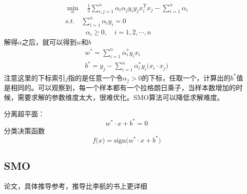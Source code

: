 \documentclass{ctexart}
\begin{document}
\begin{description}
\begin{equation}
\begin{array}{lcl}
\min\limits_{\alpha}\quad  \frac{1}{2}\sum\limits_{i,j=1}^{n}\alpha_i\alpha_{j}y_{i}y_{j}x_{i}^{\mathrm{T}}x_j -\sum\limits_{i=1}^{n}\alpha_{i}\\
s.t. \quad \sum\limits_{i=1}^{n}\alpha_{i}y_i=0\\
\quad\quad\quad \alpha_i\ge0,\quad i=1,2,\cdots,n
\end{array}
\end{equation}
解得$\alpha$之后，就可以得到$w$和$b$
\begin{equation}
\begin{array}{lcl}
w^{*}=\sum\limits_{i=1}^{n}\alpha_{i}^{*}y_{i}x_{i}\\
b^*=y_j-\sum\limits_{i=1}^{n}\alpha_{i}^{*}y_{i}\big(x_{i}\cdot x_{j} \big)
\end{array}
\end{equation}
注意这里的下标索引$j$指的是任意一个令$\alpha_j>0$的下标，任取一个，计算出的$b^*$值是相同的。可以观察到，每一个样本都有一个拉格朗日乘子，当样本数增加的时候，需要求解的参数维度太大，很难优化。SMO算法可以降低求解难度。

分离超平面：
\begin{equation}
w^*\cdot x+b^*=0
\end{equation}
分类决策函数
\begin{equation}
f\big(x\big)=\mathrm{sign}\big(w^*\cdot x+b^*\big)
\end{equation}
\end{description} 


\subsection{SMO}
\label{smo}
论文\cite{Platt:Platt1998Sequential}，具体推导参考\cite{svm:derivation}，推导比李航的书上更详细
 
\end{document}
